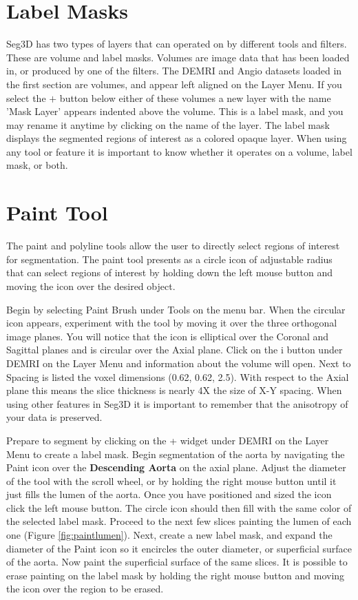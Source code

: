 \documentclass[fleqn,11pt,openany]{book}
\begin{document}
\section{Label Masks}

Seg3D has two types of layers that can operated on by different tools and filters.  These are volume and label masks.  Volumes are image data that has been loaded in, or produced by one of the filters.  The DEMRI and Angio datasets loaded in the first section are volumes, and appear left aligned on the Layer Menu.  If you select the $+$ button below either of these volumes a new layer with the name 'Mask Layer' appears indented above the volume.  This is a label mask, and you may rename it anytime by clicking on the name of the layer.  The label mask displays the segmented regions of interest as a colored opaque layer.  When using any tool or feature it is important to know whether it operates on a volume, label mask, or both. 






\section{Paint Tool}

The paint and polyline tools allow the user to directly select regions of interest for segmentation.  The paint tool presents as a circle icon of adjustable radius that can select regions of interest by holding down the left mouse button and moving the icon over the desired object.  

Begin by selecting Paint Brush under Tools on the menu bar.  When the circular icon appears, experiment with the tool by moving it over the three orthogonal image planes.  You will notice that the icon is elliptical over the Coronal and Sagittal planes and is circular over the Axial plane.  Click on the i button under DEMRI on the Layer Menu and information about the volume will open.  Next to Spacing is listed the voxel dimensions (0.62, 0.62, 2.5).  With respect to the Axial plane this means the slice thickness is nearly 4X the size of X-Y spacing.  When using other features in Seg3D it is important to remember that the anisotropy of your data is preserved.

Prepare to segment by clicking on the + widget under DEMRI on the Layer Menu to create a label mask.  Begin segmentation of the aorta by navigating the Paint icon over the {\bf Descending Aorta} on the axial plane.  Adjust the diameter of the tool with the scroll wheel, or by holding the right mouse button until it just fills the lumen of the aorta.  Once you have positioned and sized the icon click the left mouse button.  The circle icon should then fill with the same color of the selected label mask.  Proceed to the next few slices painting the lumen of each one (Figure \ref{fig:paintlumen}).  Next, create a new label mask, and expand the diameter of the Paint icon so it encircles the outer diameter, or superficial surface of the aorta.  Now paint the superficial surface of the same slices.  It is possible to erase painting on the label mask by holding the right mouse button and moving the icon over the region to be erased.
\end{document}
